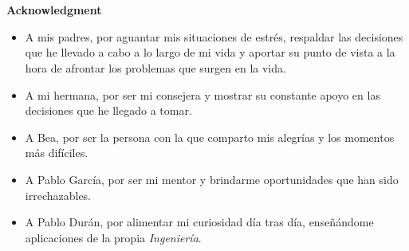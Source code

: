 
\chapter*{}
\begin{center}
\textbf{Acknowledgment}
\end{center}

\begin{itemize}

\item A mis padres, por aguantar mis situaciones de estrés, respaldar las decisiones que he llevado a cabo a lo largo de mi vida y aportar su punto de vista a la hora de afrontar los problemas que surgen en la vida.
\item A mi hermana, por ser mi consejera y mostrar su constante apoyo en las decisiones que he llegado a tomar.
\item A Bea, por ser la persona con la que comparto mis alegrías y los momentos más difíciles.
\item A Pablo García, por ser mi mentor y brindarme oportunidades que han sido irrechazables.
\item A Pablo Durán, por alimentar mi curiosidad día tras día, enseñándome aplicaciones de la propia \textit{Ingeniería}.

\end{itemize}

\newpage